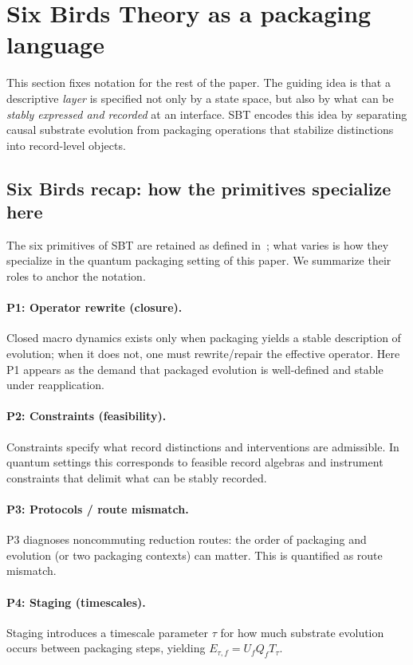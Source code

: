 \section{Six Birds Theory as a packaging language}\label{sec:sbt}

This section fixes notation for the rest of the paper. The guiding idea is that
a descriptive \emph{layer} is specified not only by a state space, but also by what can be \emph{stably expressed and recorded} at an interface.
SBT encodes this idea by separating causal substrate evolution from packaging operations that stabilize distinctions into record-level objects.\cite{Tsiokos2026SixBirds}

\subsection{Six Birds recap: how the primitives specialize here}

The six primitives of SBT are retained as defined in~\cite{Tsiokos2026SixBirds}; what varies is how they specialize in the quantum packaging setting of this paper. We summarize their roles to anchor the notation.

\paragraph{P1: Operator rewrite (closure).}
Closed macro dynamics exists only when packaging yields a stable description of evolution; when it does not, one must rewrite/repair the effective operator. Here P1 appears as the demand that packaged evolution is well-defined and stable under reapplication.

\paragraph{P2: Constraints (feasibility).}
Constraints specify what record distinctions and interventions are admissible. In quantum settings this corresponds to feasible record algebras and instrument constraints that delimit what can be stably recorded.

\paragraph{P3: Protocols / route mismatch.}
P3 diagnoses noncommuting reduction routes: the order of packaging and evolution (or two packaging contexts) can matter. This is quantified as route mismatch.

\paragraph{P4: Staging (timescales).}
Staging introduces a timescale parameter $\tau$ for how much substrate evolution occurs between packaging steps, yielding $E_{\tau,f}=U_f Q_f T_\tau$.

